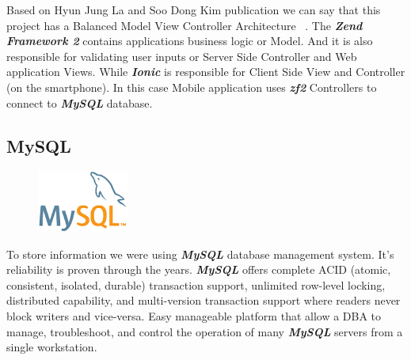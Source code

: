 
Based on Hyun Jung La and Soo Dong Kim publication we can say that this project has a Balanced Model View Controller Architecture ~\cite{MVC_Architecture_for_Developing_Service-based_Mobile_Applications}. The \textbf{\textit{Zend Framework 2}} contains applications business logic or Model. And it is also responsible for validating user inputs or Server Side Controller and  Web application Views. While \textbf{\textit{Ionic}} is responsible for Client Side View and Controller (on the smartphone). In this case Mobile application uses \textbf{\textit{zf2}} Controllers to connect to \textbf{\textit{MySQL}} database.

\subsection{MySQL}
\begin{figure}
	\includegraphics[width=3cm]{img/zf2/mysql-logo.png}
\end{figure} 
To store information we were using \textbf{\textit{MySQL}} database management system. It's reliability is proven through the years. \textbf{\textit{MySQL}} offers complete ACID (atomic, consistent, isolated, durable) transaction support, unlimited row-level locking, distributed capability, and multi-version transaction support where readers never block writers and vice-versa. Easy manageable platform that allow a DBA to manage, troubleshoot, and control the operation of many \textbf{\textit{MySQL}} servers from a single workstation. ~\cite{MySQL_Top10_Reasons}


